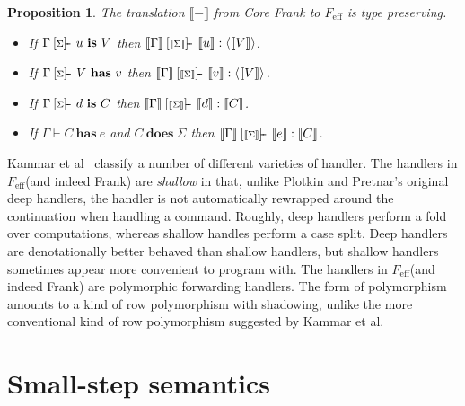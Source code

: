 \documentclass[preprint]{sigplanconf}
\makeatletter
\newcommand{\feff}{$F_\textrm{eff}$\xspace}
\newcommand{\set}[1]{\{#1\}}
\newcommand{\many}{\overline}
\newcommand{\sem}[1]{\llbracket{#1}\rrbracket}
\newcommand{\seml}{\left\llbracket}
\newcommand{\semr}{\right\rrbracket}
\newcommand{\FV}{\mathit{FV}}
\newcommand{\dom}{\mathit{dom}}
\newcommand\ba{\begin{array}}
\newcommand\ea{\end{array}}
\newcommand{\bl}{\ba{@{}c@{}}}
\newcommand{\el}{\ea}
\newcommand{\judgeword}[1]{~\mathbf{#1}~}
\newcommand{\sigentails}[1]{\mathbin{[{\text{\scriptsize ${#1}$}}]\!\text{-\!-}}\,}
\newcommand{\val}[3]  {#1 \vdash {#2} : {#3}}
\newcommand{\comp}[4]  {#1 \sigentails{#2} {#3} : {#4}}
\newcommand{\rt}[1]{\langle{#1}\rangle}   %
\newcommand{\makes}[4]  {#1 \sigentails{#2} {#3} \judgeword{is} {#4}}
\newcommand{\has}[4] {#1 \sigentails{#2} {#3} \judgeword{has} {#4}}
\newcommand{\can}[4]{#1 \sigentails{#2} {#3} \judgeword{is} {#4}}
\newcommand{\does}[3]{#1 \vdash {#2} \judgeword{has} {#3}}
\newcommand{\effs}[2]{{#1} \judgeword{does} {#2}}
\newcommand{\makesgs}{\makes{\Gamma}{\sigs}}
\newcommand{\hasgs}{\has{\Gamma}{\sigs}}
\newcommand{\cangs}{\can{\Gamma}{\sigs}}
\newcommand{\doesg}{\does{\Gamma}}
\newtheorem{proposition}[theorem]{Proposition}
\newcommand{\sigs}{\Sigma}
\makeatother
\begin{document}
\begin{proposition}
The translation $\sem{-}$ from Core Frank to \feff is type preserving.
\begin{itemize}
\item If $\makesgs{u}{V}$ then $\comp{\sem{\Gamma}}{\sem{\sigs}}{\sem{u}}{\rt{\sem{V}}}$.
\item If $\hasgs{V}{v}$   then $\comp{\sem{\Gamma}}{\sem{\sigs}}{\sem{v}}{\rt{\sem{V}}}$.
\item If $\cangs{d}{C}$   then $\comp{\sem{\Gamma}}{\sem{\sigs}}{\sem{d}}{\sem{C}}$.
\item If $\doesg{C}{e}$ and $\effs{C}{\sigs}$ then
  $\comp{\sem{\Gamma}}{\sem{\sigs}}{\sem{e}}{\sem{C}}$.
\end{itemize}
\end{proposition}

Kammar et al~\cite{KammarLO13} classify a number of different
varieties of handler.
%
The handlers in \feff (and indeed Frank) are \emph{shallow} in that,
unlike Plotkin and Pretnar's original deep handlers, the handler is
not automatically rewrapped around the continuation when handling a
command. Roughly, deep handlers perform a fold over computations,
whereas shallow handles perform a case split. Deep handlers are
denotationally better behaved than shallow handlers, but shallow
handlers sometimes appear more convenient to program with.
%
The handlers in \feff (and indeed Frank) are polymorphic forwarding
handlers. The form of polymorphism amounts to a kind of row
polymorphism with shadowing, unlike the more conventional kind of row
polymorphism suggested by Kammar et al.



\section{Small-step semantics}
\label{sec:semantics}
\end{document}
